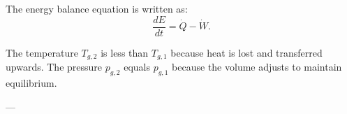 The energy balance equation is written as:  
\[
\frac{dE}{dt} = \dot{Q} - \dot{W}.
\]  

The temperature \( T_{g,2} \) is less than \( T_{g,1} \) because heat is lost and transferred upwards. The pressure \( p_{g,2} \) equals \( p_{g,1} \) because the volume adjusts to maintain equilibrium.  

---